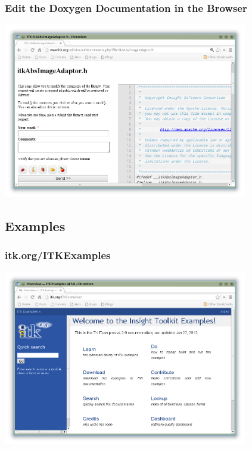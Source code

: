 \begin{frame}
  \frametitle{Edit the Doxygen Documentation in the Browser}
  \includegraphics[width=0.8\textwidth]{../Art/Doxygen2.png}
\end{frame}

\subsection{Examples}

\begin{frame}
  \frametitle{itk.org/ITKExamples}
  \includegraphics[width=0.8\textwidth]{../Art/ITKExamples.png}
\end{frame}


